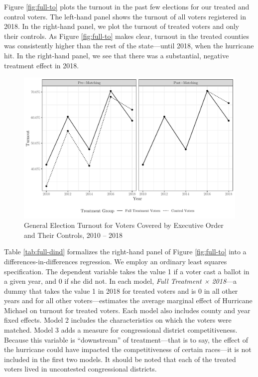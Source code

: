 \documentclass[
  12pt,
]{article}
\begin{document}
Figure \ref{fig:full-to} plots the turnout in the past few elections for our treated and control voters. The left-hand panel shows the turnout of all voters registered in 2018. In the right-hand panel, we plot the turnout of treated voters and only their controls. As Figure \ref{fig:full-to} makes clear, turnout in the treated counties was consistently higher than the rest of the state---until 2018, when the hurricane hit. In the right-hand panel, we see that there was a substantial, negative treatment effect in 2018.

\begin{figure}[h]

{\centering \includegraphics{hurricane_michael_files/figure-latex/full-to-chunk-1} 

}

\caption{\label{fig:full-to}General Election Turnout for Voters Covered by Executive Order and Their Controls, 2010 -- 2018}\label{fig:full-to-chunk}
\end{figure}

Table \ref{tab:full-dind} formalizes the right-hand panel of Figure \ref{fig:full-to} into a differences-in-differences regression. We employ an ordinary least squares specification. The dependent variable takes the value 1 if a voter cast a ballot in a given year, and 0 if she did not. In each model, \emph{Full Treatment × 2018}---a dummy that takes the value 1 in 2018 for treated voters and is 0 in all other years and for all other voters---estimates the average marginal effect of Hurricane Michael on turnout for treated voters. Each model also includes county and year fixed effects. Model 2 includes the characteristics on which the voters were matched. Model 3 adds a measure for congressional district competitiveness. Because this variable is ``downstream'' of treatment---that is to say, the effect of the hurricane could have impacted the competitiveness of certain races---it is not included in the first two models. It should be noted that each of the treated voters lived in uncontested congressional districts.
\end{document}
